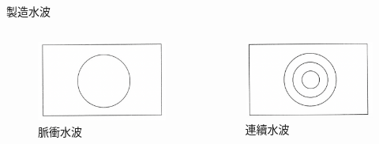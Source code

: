 \documentclass[13pt]{beamer}
\begin{document}
\begin{frame}{製造水波}
    \begin{columns}
        \begin{figure}
            \centering
            \includegraphics[width=0.97\linewidth]{images/Screenshot 2023-09-25 at 2.30.30 AM.png}
            \caption{脈衝水波}

        \end{figure}
        \begin{figure}
            \centering
            \includegraphics[width=1\linewidth]{images/Screenshot 2023-09-25 at 2.31.45 AM.png}
            \caption{連續水波}

        \end{figure}
    \end{columns}
\end{frame}
\end{document}
